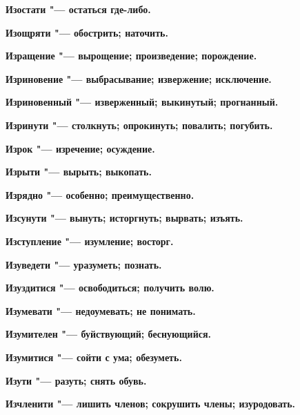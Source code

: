 \bfseries Изостати \normalfont{} "--- остаться где-либо. 




\bfseries Изощряти \normalfont{} "--- обострить; наточить. 




\bfseries Изращение \normalfont{} "--- вырощение; произведение; порождение. 




\bfseries Изриновение \normalfont{} "--- выбрасывание; извержение; исключение. 




\bfseries Изриновенный \normalfont{} "--- изверженный; выкинутый; прогнанный. 




\bfseries Изринути \normalfont{} "--- столкнуть; опрокинуть; повалить; погубить. 




\bfseries Изрок \normalfont{} "--- изречение; осуждение. 




\bfseries Изрыти \normalfont{} "--- вырыть; выкопать. 




\bfseries Изрядно \normalfont{} "--- особенно; преимущественно. 




\bfseries Изсунути \normalfont{} "--- вынуть; исторгнуть; вырвать; изъять. 




\bfseries Изступление \normalfont{} "--- изумление; восторг. 




\bfseries Изуведети \normalfont{} "--- уразуметь; познать. 




\bfseries Изуздитися \normalfont{} "--- освободиться; получить волю. 




\bfseries Изумевати \normalfont{} "--- недоумевать; не понимать. 




\bfseries Изумителен \normalfont{} "--- буйствующий; беснующийся. 




\bfseries Изумитися \normalfont{} "--- сойти с ума; обезуметь. 




\bfseries Изути \normalfont{} "--- разуть; снять обувь. 




\bfseries Изчленити \normalfont{} "--- лишить членов; сокрушить члены; изуродовать. 




